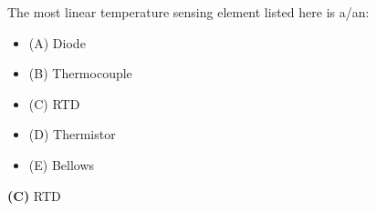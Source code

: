 

The most linear temperature sensing element listed here is a/an:

\begin{itemize}
\item{(A)} Diode
\vskip 5pt 
\item{(B)} Thermocouple
\vskip 5pt 
\item{(C)} RTD
\vskip 5pt 
\item{(D)} Thermistor
\vskip 5pt 
\item{(E)} Bellows
\end{itemize}







{\bf (C)} RTD
 









